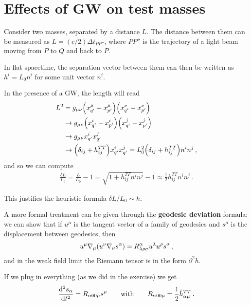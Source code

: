 \documentclass[main.tex]{subfiles}
\begin{document}
\section{Effects of GW on test masses}


Consider two masses, separated by a distance \(L\). 
The distance between them can be measured as \(L = (c/2) \Delta t_{P P''}\), where \(P P''\) is the trajectory of a light beam moving from \(P\) to \(Q\) and back to \(P\).

In flat spacetime, the separation vector between them can then be written as \(h^{i} = L_0 n^i\) for some unit vector \(n^i\). 

In the presence of a GW, the length will read  
%
\begin{align}
L^2 
&= g_{\mu \nu } 
\qty(x^{\mu }_{q'} - x^{\mu }_{p'})
\qty(x^{\nu }_{q'} - x^{\nu }_{p'})   \\
&\to g_{\mu \nu } 
\qty(x^{i }_{q'} - x^{i }_{p'})
\qty(x^{j }_{q'} - x^{j }_{p'})  \\
&\to g_{\mu \nu } 
x^{i }_{q'}
x^{j }_{q'}    \\
&\to \qty(\delta_{ij} + h_{ij}^{TT}) x^{i}_{q'} x^{j}_{q'} 
= L_0^2 \qty(\delta_{ij} + h_{ij}^{TT}) n^i n^j
\,,
\end{align}
%
and so we can compute 
%
\begin{align}
\frac{ \delta L}{L_0 } = \frac{L}{L_0 } - 1 = \sqrt{1 + h_{ij}^{TT} n^i n^j} - 1 \approx \frac{1}{2} h_{ij}^{TT} n^i n^j
\,.
\end{align}

This justifies the heuristic formula \(\delta L / L_0 \sim h\). 

A more formal treatment can be given through the \textbf{geodesic deviation} formula: we can show that if \(u^{\mu }\) is the tangent vector of a family of geodesics and \(s^{\mu }\) is the displacement between geodesics, then
%
\begin{align}
u^{\mu } \nabla_{\mu } \qty( u^{\nu } \nabla_{\nu } s^{\alpha })
= R^{\alpha }_{\lambda \rho \sigma } u^{\lambda } u^{\rho } s^{\sigma }
\,,
\end{align}
%
and in the weak field limit the Riemann tensor is in the form \(\partial^2 h\).

If we plug in everything (as we did in the exercise) we get 
%
\begin{align}
\dv[2]{s_\alpha }{t} = R_{\alpha 00 \mu } s^{\mu }
\qquad \text{with} \qquad
R_{\alpha 00 \mu } = \frac{1}{2} \ddot{h}_{\alpha \mu }^{TT}
\,.
\end{align}
\end{document}
